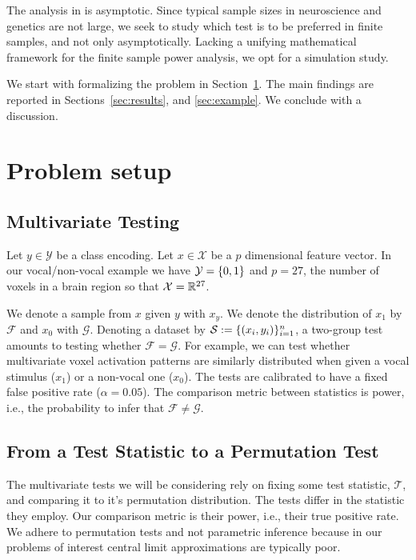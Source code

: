 \documentclass[onecolumn,draftclsnofoot]{IEEEtran}
\begin{document}
The analysis in \cite{ramdas_classification_2016} is asymptotic. 
Since typical sample sizes in neuroscience and genetics are not large, we seek to study which test is to be preferred in finite samples, and not only asymptotically.
Lacking a unifying mathematical framework for the finite sample power analysis, we opt for a simulation study. 

We start with formalizing the problem in Section~\ref{sec:problem_setup}.
The main findings are reported in Sections~\ref{sec:results}, and \ref{sec:example}.
We conclude with a discussion.







\section{Problem setup}
\label{sec:problem_setup}


\subsection{Multivariate Testing}

Let $y \in \mathcal{Y}$ be a class encoding. 
Let $x \in \mathcal{X}$ be a $p$ dimensional feature vector. 
In our vocal/non-vocal example we have $\mathcal{Y}=\{ 0,1 \}$ and $p=27$, the number of voxels in a brain region so that $\mathcal{X}=\mathbb{R}^{27}$. 

We denote a sample from $x$ given $y$ with $x_y$.
We denote the distribution of $x_1$ by $\mathcal{F}$ and $x_0$ with $\mathcal{G}$.
Denoting a dataset by $\mathcal{S}:=\{(x_i,y_i)\}_{i=1}^n$, a two-group test amounts to testing whether $\mathcal{F}=\mathcal{G}$.
For example, we can test whether multivariate voxel activation patterns are similarly distributed when given a vocal stimulus ($x_1$) or a non-vocal one ($x_0$).
The tests are calibrated to have a fixed false positive rate ($\alpha=0.05$).
The comparison metric between statistics is power, i.e., the probability to infer that $\mathcal{F}\neq\mathcal{G}$.


\subsection{From a Test Statistic to a Permutation Test}

The multivariate tests we will be considering rely on fixing some test statistic, $\mathcal{T}$, and comparing it to it's permutation distribution. 
The tests differ in the statistic they employ.
Our comparison metric is their power, i.e., their true positive rate. 
We adhere to permutation tests and not parametric inference because in our problems of interest central limit approximations are typically poor.
\end{document}
